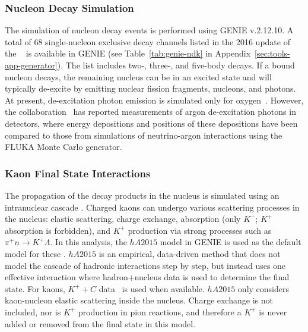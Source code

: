 \subsubsection{Nucleon Decay Simulation}
\label{sec:ndksim}

The simulation of nucleon decay events is performed using GENIE v.2.12.10. 
A total of \num{68} single-nucleon exclusive decay channels listed in the 2016 update of the ~\cite{Tanabashi:2018oca} %
is available in GENIE (see Table~\ref{tab:genie-ndk} 
in Appendix~\ref{sec:tools-app-generator}). The list includes two-, three-, and five-body decays. 
If a bound nucleon decays, the remaining nucleus can be in an excited state and will typically de-excite by emitting nuclear fission fragments, nucleons, and photons. At present, de-excitation photon emission is simulated only for oxygen~\cite{Andreopoulos:2015wxa}.  However, the \argoneut collaboration~\cite{Acciarri:2018myr} has reported measurements of argon de-excitation photons in  detectors,
where energy depositions and positions of these depositions have been compared to those from simulations of neutrino-argon interactions using the FLUKA Monte Carlo generator.  

\subsubsection{Kaon Final State Interactions}
\label{sec:final-state-interactions}

The propagation of the decay products in the nucleus is simulated using an intranuclear cascade . 
Charged kaons can undergo various scattering processes in the nucleus: elastic scattering, charge exchange, absorption (only $K^{-}$; $K^{+}$ absorption is forbidden), and $K^{+}$ production via strong processes such as $\pi^{+}n \rightarrow K^{+} \Lambda$.  In this analysis, the $hA2015$ model in GENIE is used as the default model for these .  $hA2015$ is an empirical, data-driven method that does not model the cascade of hadronic interactions step by step, but instead uses one effective interaction where hadron+nucleus data is used to determine the final state.
For kaons, $K^{+}+C$ data~\cite{Bugg:1968zz,Friedman:1997eq}
is used when available. $hA2015$ only considers kaon-nucleon elastic scattering inside the nucleus.  Charge exchange is not included, nor is $K^+$ production in pion reactions, and therefore a $K^+$ is never added or removed from the final state in this model. 

